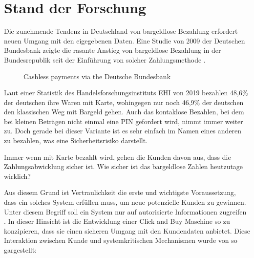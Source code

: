 \section{Stand der Forschung}


Die zunehmende Tendenz in Deutschland von bargeldlose Bezahlung erfordert neuen Umgang mit den 
eigegebenen Daten. Eine Studie von 2009 der Deutschen Bundesbank zeigte die rasante Anstieg von 
bargeldlose Bezahlung in der Bundesrepublik seit der Einführung von solcher Zahlungsmethode 
\cite{refrep:DBCP}.

\begin{figure}[htb]
    \caption{Cashless payments via the Deutsche Bundesbank}
    \label{fig:refrep_DB}
\end{figure}


Laut einer Statistik des Handelsforschungsinstituts EHI von 2019 \cite{refart:KSDL} bezahlen 48,6\% 
der deutschen ihre Waren mit Karte, wohingegen nur noch 46,9\% der deutschen den klassischen 
Weg mit Bargeld gehen. Auch das kontaklose Bezahlen, bei dem bei kleinen Beträgen nicht einmal eine
PIN gefordert wird, nimmt immer weiter zu. Doch gerade bei dieser Variante ist es sehr einfach
im Namen eines anderen zu bezahlen, was eine Sicherheitsrisiko darstellt.


Immer wenn mit Karte bezahlt wird, gehen die Kunden davon aus, dass die Zahlungsabwicklung sicher ist. 
Wie sicher ist das bargeldlose Zahlen heutzutage wirklich? 


Aus diesem Grund ist Vertraulichkeit die erste und wichtigste Voraussetzung, dass ein solches System 
erfüllen muss, um neue potenzielle Kunden zu gewinnen. Unter diesem Begriff soll ein System nur auf 
autorisierte Informationen zugreifen \cite{refbook:SWIS}. In dieser Hinsicht ist die Entwicklung 
einer Click and Buy Maschine so zu konzipieren, dass sie einen sicheren Umgang mit den Kundendaten
anbietet. Diese Interaktion zwischen Kunde und systemkritischen Mechanismen wurde von 
\cite{refart:HARE} so gargestellt:

